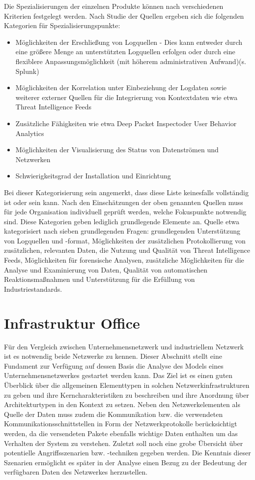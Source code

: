Die Spezialisierungen der einzelnen Produkte können nach verschiedenen Kriterien festgelegt werden. Nach Studie der Quellen ergeben sich die folgenden Kategorien für Spezialisierungspunkte:
\begin{itemize}
\item Möglichkeiten der Erschließung von Logquellen - Dies kann entweder durch eine größere Menge an unterstützten Logquellen erfolgen oder durch eine flexiblere Anpassungsmöglichkeit (mit höherem administrativen Aufwand)(s. Splunk)
\item Möglichkeiten der Korrelation unter Einbeziehung der Logdaten sowie weiterer externer Quellen für die Integrierung von Kontextdaten wie etwa Threat Intelligence Feeds
\item Zusätzliche Fähigkeiten wie etwa \glqq Deep Packet Inspect\grqq  oder \glqq User Behavior Analytics\grqq
\item Möglichkeiten der Visualisierung des Status von Datenströmen und Netzwerken
\item Schwierigkeitsgrad der Installation und Einrichtung
\end{itemize}

Bei dieser Kategorisierung sein angemerkt, dass diese Liste keinesfalls vollständig ist oder sein kann. Nach den Einschätzungen der oben genannten Quellen muss für jede Organisation individuell geprüft werden, welche Fokuspunkte notwendig sind. Diese Kategorien geben lediglich grundlegende Elemente an.
Quelle \cite{SIEMVendors5}
etwa kategorisiert nach sieben grundlegenden Fragen: grundlegenden Unterstützung von Logquellen und -format, Möglichkeiten der zusätzlichen Protokollierung von zusätzlichen, relevanten Daten, die Nutzung und Qualität von Threat Intelligence Feeds, Möglichkeiten für forensische Analysen, zusätzliche Möglichkeiten für die Analyse und Examinierung von Daten, Qualität von automatischen Reaktionsmaßnahmen und Unterstützung für die Erfüllung von Industriestandards. 

\section{Infrastruktur Office}
Für den Vergleich zwischen Unternehmensnetzwerk und industriellem Netzwerk ist es notwendig beide Netzwerke zu kennen. Dieser Abschnitt stellt eine Fundament zur Verfügung auf dessen Basis die Analyse des Models eines Unternehmensnetzwerkes gestartet werden kann. Das Ziel ist es einen guten Überblick über die allgemeinen Elementtypen in solchen Netzwerkinfrastrukturen zu geben und ihre Kerncharakteristiken zu beschreiben und ihre Anordnung über Architekturtypen in den Kontext zu setzen. Neben den Netzwerkelementen als Quelle der Daten muss zudem die Kommunikation bzw. die verwendeten Kommunikationsschnittstellen in Form der Netzwerkprotokolle berücksichtigt werden, da die versendeten Pakete ebenfalls wichtige Daten enthalten um das Verhalten der System zu verstehen. Zuletzt soll noch eine grobe Übersicht über potentielle Angriffsszenarien bzw. -techniken gegeben werden. Die Kenntnis dieser Szenarien ermöglicht es später in der Analyse einen Bezug zu der Bedeutung der verfügbaren Daten des Netzwerkes herzustellen.

